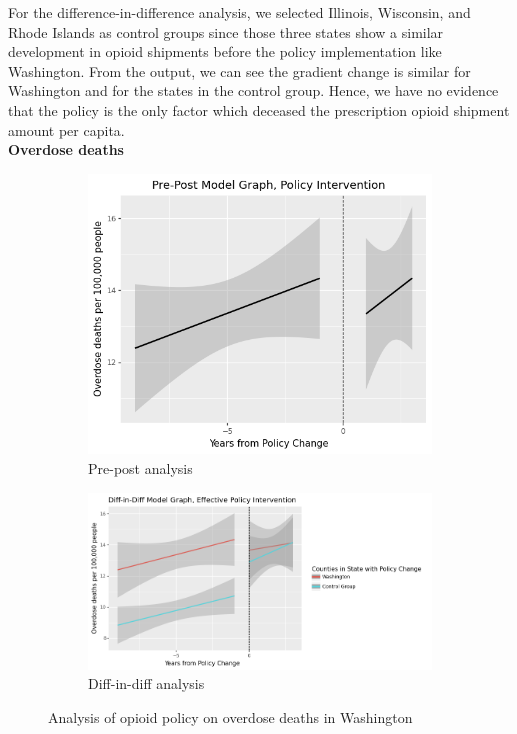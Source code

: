 \documentclass[12pt,letterpaper]{article}
\begin{document}
For the difference-in-difference analysis, we selected Illinois, Wisconsin, and Rhode Islands as control groups since those three states show a similar development in opioid shipments before the policy implementation like Washington. From the output, we can see the gradient change is similar for Washington and for the states in the control group. Hence, we have no evidence that the policy is the only factor which deceased the prescription opioid shipment amount per capita. \\

\noindent \textbf{Overdose deaths}

\begin{figure}[!h]
\centering
\begin{subfigure}{.5\textwidth}
  \centering
  \includegraphics[width=0.7\linewidth]{../30_results/General_Results/washington_overdose_death_prepost.png}
  \caption{Pre-post analysis}
  \label{fig:wa_death_prepost}
\end{subfigure}%
\begin{subfigure}{.55\textwidth}
  \centering
  \includegraphics[width=1\linewidth]{../30_results/General_Results/washington_overdose_death_diffdiff.png}
  \caption{Diff-in-diff analysis}
  \label{fig:wa_death_did}
\end{subfigure}
\caption{Analysis of opioid policy on overdose deaths in Washington}
\label{fig:wa_death}
\end{figure}
\end{document}
